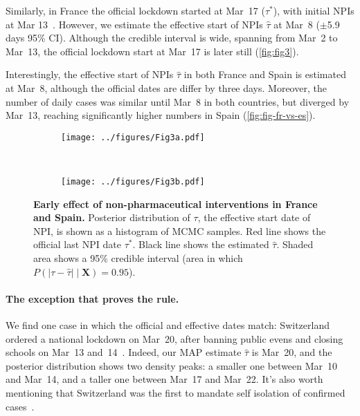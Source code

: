 \documentclass[12pt]{extarticle}
\let\vec\mathbf
\begin{document}
Similarly, in France the official lockdown started at Mar~17 ($\tau^*$), with initial NPIs at Mar 13~\citep{Flaxman2020}. 
However, we estimate the effective start of NPIs $\hat{\tau}$ at Mar~8 ($\pm$5.9 days 95\% CI). Although the credible interval is wide, spanning from Mar~2 to Mar~13, the official lockdown start at Mar~17 is later still (\autoref{fig:fig3}).

Interestingly, the effective start of NPIs $\hat{\tau}$ in both France and Spain is estimated at Mar~8, although the official dates are differ by three days. Moreover, the number of daily cases was similar until Mar~8 in both countries, but diverged by Mar~13, reaching significantly higher numbers in Spain (\autoref{fig:fig-fr-vs-es}).



\begin{figure}[h]
    \centering
    \begin{subfigure}{0.45\textwidth}
        \texttt{[image: ../figures/Fig3a.pdf]}
    \end{subfigure}
    ~
    \begin{subfigure}{0.45\textwidth}
        \texttt{[image: ../figures/Fig3b.pdf]}
    \end{subfigure}
    \caption{
    \textbf{Early effect of non-pharmaceutical interventions in France and Spain.}
    Posterior distribution of $\tau$, the effective start date of NPI, is shown as a histogram of MCMC samples. Red line shows the official last NPI date $\tau^*$. Black line shows the estimated $\hat{\tau}$. Shaded area shows a 95\% credible interval (area in which $P(|\tau - \hat{\tau}| \mid \vec{X}) = 0.95$). 
	}
	\label{fig:fig3}
\end{figure}


\paragraph*{The exception that proves the rule.}
We find one case in which the official and effective dates match: Switzerland ordered a national lockdown on Mar~20, after banning public evens and closing schools on Mar~13 and~14~\citep{Flaxman2020}.
Indeed, our MAP estimate $\hat{\tau}$ is Mar~20, and the posterior distribution shows two density peaks: a smaller one between Mar~10 and Mar~14, and a taller one between Mar~17 and Mar~22. It's also worth mentioning that Switzerland was the first to mandate self isolation of confirmed cases~\citep{Flaxman2020}.
\end{document}
